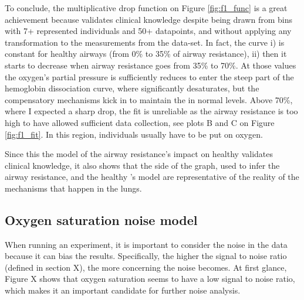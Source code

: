 
To conclude, the multiplicative drop function on Figure \ref{fig:f1_func} is a great achievement because validates clinical knowledge despite being drawn from bins with 7+ represented individuals and 50+ datapoints, and without applying any transformation to the \OXSat measurements from the data-set. In fact, the curve i) is constant for healthy airways (from 0\% to 35\% of airway resistance), ii) then it starts to decrease when airway resistance goes from 35\% to 70\%. At those values the oxygen's partial pressure is sufficiently reduces to enter the steep part of the hemoglobin dissociation curve, where \OXSat significantly desaturates, but the compensatory mechanisms kick in to maintain the \OXSat in normal levels. Above 70\%, where I expected a sharp drop, the fit is unreliable as the airway resistance is too high to have allowed sufficient data collection, see plots B and C on Figure \ref{fig:f1_fit}. In this region, individuals usually have to be put on oxygen.

Since this the model of the airway resistance's impact on healthy \OXSat validates clinical knowledge, it also shows that the \F side of the graph, used to infer the airway resistance, and the healthy \OXSat's model are representative of the reality of the mechanisms that happen in the lungs.

\subsection{Oxygen saturation noise model}

When running an experiment, it is important to consider the noise in the data because it can bias the results. Specifically, the higher the signal to noise ratio (defined in section X), the more concerning the noise becomes. At first glance, Figure X shows that oxygen saturation seems to have a low signal to noise ratio, which makes it an important candidate for further noise analysis.

